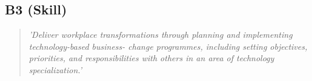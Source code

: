 \subsection*{B3 (Skill)}

  \begin{quote}
    \textit{'Deliver workplace transformations through
    planning and implementing technology-based business-
    change programmes, including setting objectives,
    priorities, and responsibilities with others in an area of
    technology specialization.'}
  \end{quote}

\newpage